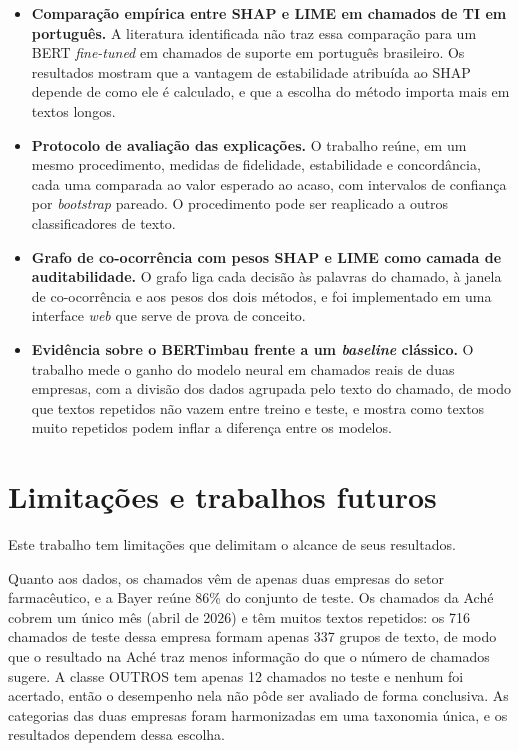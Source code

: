 \documentclass[
    12pt,                %
    openright,           %
    oneside,             %
    a4paper,             %
    english,             %
    brazil               %
]{abntex2}
\begin{document}
\begin{itemize}
    \item \textbf{Comparação empírica entre SHAP e LIME em chamados de TI em português.} A literatura identificada não traz essa comparação para um BERT \textit{fine-tuned} em chamados de suporte em português brasileiro. Os resultados mostram que a vantagem de estabilidade atribuída ao SHAP depende de como ele é calculado, e que a escolha do método importa mais em textos longos.
 
    \item \textbf{Protocolo de avaliação das explicações.} O trabalho reúne, em um mesmo procedimento, medidas de fidelidade, estabilidade e concordância, cada uma comparada ao valor esperado ao acaso, com intervalos de confiança por \textit{bootstrap} pareado. O procedimento pode ser reaplicado a outros classificadores de texto.
 
    \item \textbf{Grafo de co-ocorrência com pesos SHAP e LIME como camada de auditabilidade.} O grafo liga cada decisão às palavras do chamado, à janela de co-ocorrência e aos pesos dos dois métodos, e foi implementado em uma interface \textit{web} que serve de prova de conceito.
 
    \item \textbf{Evidência sobre o BERTimbau frente a um \textit{baseline} clássico.} O trabalho mede o ganho do modelo neural em chamados reais de duas empresas, com a divisão dos dados agrupada pelo texto do chamado, de modo que textos repetidos não vazem entre treino e teste, e mostra como textos muito repetidos podem inflar a diferença entre os modelos.
\end{itemize}

\section{Limitações e trabalhos futuros}
Este trabalho tem limitações que delimitam o alcance de seus resultados.

Quanto aos dados, os chamados vêm de apenas duas empresas do setor farmacêutico, e a Bayer reúne 86\% do conjunto de teste. Os chamados da Aché cobrem um único mês (abril de 2026) e têm muitos textos repetidos: os 716 chamados de teste dessa empresa formam apenas 337 grupos de texto, de modo que o resultado na Aché traz menos informação do que o número de chamados sugere. A classe OUTROS tem apenas 12 chamados no teste e nenhum foi acertado, então o desempenho nela não pôde ser avaliado de forma conclusiva. As categorias das duas empresas foram harmonizadas em uma taxonomia única, e os resultados dependem dessa escolha.
\end{document}
